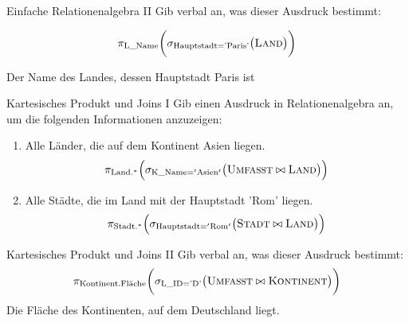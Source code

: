 \documentclass[12pt,a4paper,notitlepage,leqno]{article}
\begin{document}
\begin{aufgabe}{Einfache Relationenalgebra II}
Gib verbal an, was dieser Ausdruck bestimmt:

\[\pi_{\textrm{L\_Name}}\biggl(\sigma_{\textrm{Hauptstadt='Paris'}}\bigl(\textsc{Land}\bigr)\biggr)\]

Der Name des Landes, dessen Hauptstadt Paris ist

\end{aufgabe}

\begin{aufgabe}{Kartesisches Produkt und Joins I}
Gib einen Ausdruck in Relationenalgebra an, um die folgenden Informationen anzuzeigen:
\begin{enumerate}
    \item Alle Länder, die auf dem Kontinent Asien liegen.
    \[
        \pi_{\mathrm{Land.^{\ast}}}\Bigl(\sigma_{\mathrm{K\_Name='Asien'}}\bigl(\textsc{Umfasst} \bowtie \textsc{Land}\bigr)\Bigr)
    \]
    \item Alle Städte, die im Land mit der Hauptstadt 'Rom' liegen.
    \[
        \pi_{\mathrm{Stadt.^{\ast}}}\Bigl(\sigma_{\mathrm{Hauptstadt='Rom'}}\bigl(\textsc{Stadt} \bowtie \textsc{Land}\bigr)\Bigr)
    \]
\end{enumerate}    
\end{aufgabe}

\begin{aufgabe}{Kartesisches Produkt und Joins II}
Gib verbal an, was dieser Ausdruck bestimmt:
\[\pi_{\textrm{Kontinent.Fläche}}\biggl(\sigma_{\textrm{L\_ID='D'}}\bigl(\textsc{Umfasst}\bowtie\textsc{Kontinent}\bigr)\biggr)\]
Die Fläche des Kontinenten, auf dem Deutschland liegt.
\end{aufgabe}
\end{document}
